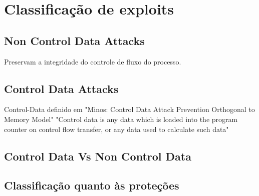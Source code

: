 
\chapter{Classificação de exploits}
\label{chap:classificacao}

\section{Non Control Data Attacks}
Preservam a integridade do controle de fluxo do processo.

\section{Control Data Attacks}
	Control-Data definido em "Minos: Control Data Attack Prevention Orthogonal to Memory Model"
	"Control data is any data which is loaded into the program counter on control flow transfer, 
	or any data used to calculate such data"

\section{Control Data Vs Non Control Data}

\section{Classificação quanto às proteções}

